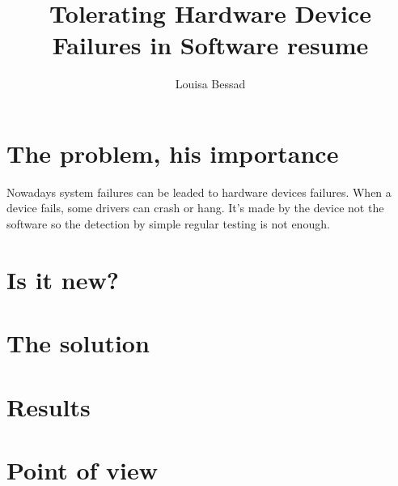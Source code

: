 \documentclass[11pt]{article}
\title{\textbf{Tolerating Hardware Device Failures in Software resume}}
\author{Louisa Bessad}
\begin{document}
\maketitle

\section{The problem, his importance}
Nowadays system failures can be leaded to hardware devices failures. When a device fails, some drivers can crash or hang. It's made by the device not the software so the detection by simple regular testing is not enough.

\section{Is it new?}

\section{The solution}

\section{Results}

\section{Point of view}
\end{document}
